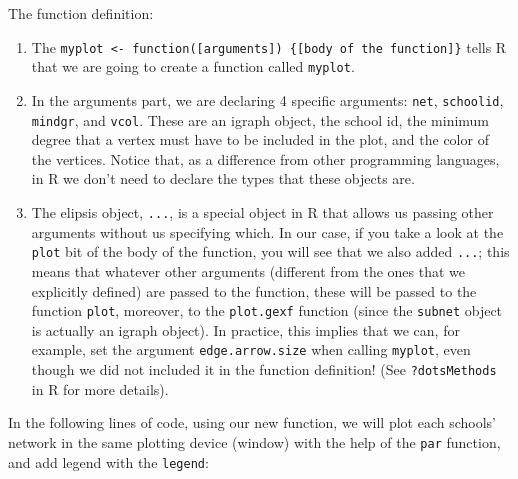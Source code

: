 \documentclass[]{book}
\theoremstyle{definition}
\theoremstyle{definition}
\theoremstyle{definition}
\theoremstyle{remark}
\begin{document}
The function definition:

\begin{enumerate}
\def\labelenumi{\arabic{enumi}.}
\item
  The
  \texttt{myplot\ \textless{}-\ function({[}arguments{]})\ \{{[}body\ of\ the\ function{]}\}}
  tells R that we are going to create a function called \texttt{myplot}.
\item
  In the arguments part, we are declaring 4 specific arguments:
  \texttt{net}, \texttt{schoolid}, \texttt{mindgr}, and \texttt{vcol}.
  These are an igraph object, the school id, the minimum degree that a
  vertex must have to be included in the plot, and the color of the
  vertices. Notice that, as a difference from other programming
  languages, in R we don't need to declare the types that these objects
  are.
\item
  The elipsis object, \texttt{...}, is a special object in R that allows
  us passing other arguments without us specifying which. In our case,
  if you take a look at the \texttt{plot} bit of the body of the
  function, you will see that we also added \texttt{...}; this means
  that whatever other arguments (different from the ones that we
  explicitly defined) are passed to the function, these will be passed
  to the function \texttt{plot}, moreover, to the \texttt{plot.gexf}
  function (since the \texttt{subnet} object is actually an igraph
  object). In practice, this implies that we can, for example, set the
  argument \texttt{edge.arrow.size} when calling \texttt{myplot}, even
  though we did not included it in the function definition! (See
  \texttt{?dotsMethods} in R for more details).
\end{enumerate}

In the following lines of code, using our new function, we will plot
each schools' network in the same plotting device (window) with the help
of the \texttt{par} function, and add legend with the \texttt{legend}:
\end{document}
